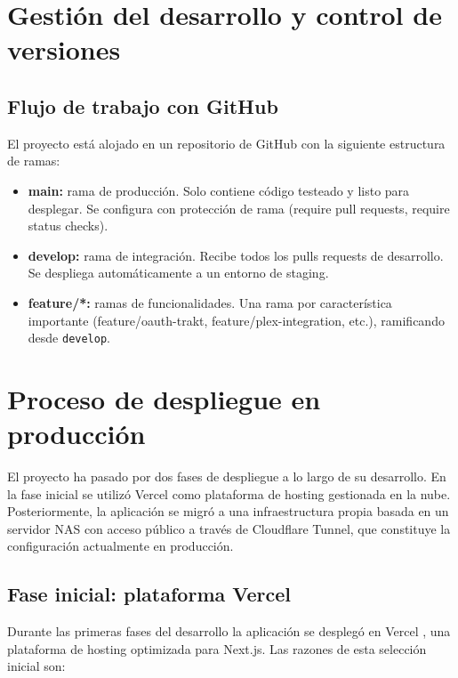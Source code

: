 \section{Gestión del desarrollo y control de versiones}

\subsection{Flujo de trabajo con GitHub}

El proyecto está alojado en un repositorio de GitHub con la siguiente estructura de ramas:

\begin{itemize}
\item \textbf{main:} rama de producción. Solo contiene código testeado y listo para desplegar. Se configura con protección de rama (require pull requests, require status checks).
\item \textbf{develop:} rama de integración. Recibe todos los pulls requests de desarrollo. Se despliega automáticamente a un entorno de staging.
\item \textbf{feature/*:} ramas de funcionalidades. Una rama por característica importante (feature/oauth-trakt, feature/plex-integration, etc.), ramificando desde \texttt{develop}.
\end{itemize}

\section{Proceso de despliegue en producción}

El proyecto ha pasado por dos fases de despliegue a lo largo de su desarrollo. En la fase inicial se utilizó Vercel como plataforma de hosting gestionada en la nube. Posteriormente, la aplicación se migró a una infraestructura propia basada en un servidor NAS con acceso público a través de Cloudflare Tunnel, que constituye la configuración actualmente en producción.

\subsection{Fase inicial: plataforma Vercel}

Durante las primeras fases del desarrollo la aplicación se desplegó en Vercel \parencite{Vercel:2024a,Vercel:2024d}, una plataforma de hosting optimizada para Next.js. Las razones de esta selección inicial son:

